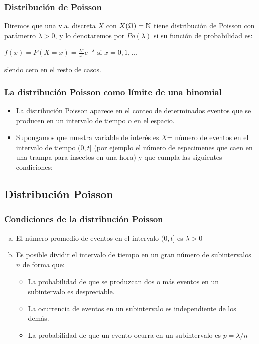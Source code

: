 \begin{frame}
     \frametitle{Distribución de Poisson}
     Diremos que una v.a. discreta $X$ con $X(\Omega)=\mathbb{N}$ tiene
     distribuci\'on de Poisson con par\'ametro $\lambda>0$, y lo denotaremos
     por $Po(\lambda)$ si su funci\'on de probabilidad es:

    $\displaystyle f(x)=P(X=x)=\frac{\lambda^x}{x!} e^{-\lambda}\mbox{ si }
     x=0,1,\ldots$

     siendo cero en el resto de casos.
\end{frame}

\begin{frame}
    \frametitle{La distribución Poisson como límite de una binomial}
\begin{itemize}
\item La distribución Poisson aparece en el conteo de determinados  eventos que se producen en un intervalo de tiempo o en el espacio.
\item Supongamos que nuestra variable de inter\'es es  $X$= n\'umero de eventos en el intervalo de tiempo $(0,t]$ (por ejemplo el número de especimenes que caen en una trampa para insectos en una hora) y que cumpla las siguientes condiciones:
\end{itemize}
\end{frame}

\subsection{Distribución  Poisson}

\begin{frame}
\frametitle{Condiciones de la distribución Poisson}
    \begin{enumerate}[a)]
        \item El número promedio de eventos en el intervalo $(0,t]$ es
        $\lambda>0$
        \item Es posible dividir el intervalo de tiempo en un
        gran número de subintervalos~$n$ de forma que:
        \begin{itemize}
        \item La probabilidad de que se produzcan dos o m\'as eventos en un subintervalo es despreciable.
        \item La ocurrencia de eventos en un subintervalo  es independiente de los demás.
        \item La probabilidad de que un evento ocurra en un subintervalo  es $p=\lambda/n$
        \end{itemize}
        \end{enumerate}
\end{frame}

